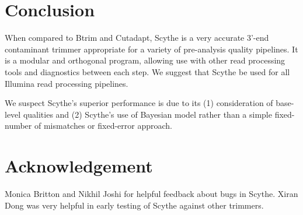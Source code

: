 \documentclass{bioinfo}
\begin{document}
\begin{methods}
\end{methods}

\section{Conclusion}

When compared to Btrim and Cutadapt, Scythe is a very accurate 3'-end
contaminant trimmer appropriate for a variety of pre-analysis quality
pipelines. It is a modular and orthogonal program, allowing use with
other read processing tools and diagnostics between each step. We
suggest that Scythe be used for all Illumina read processing
pipelines.

We suspect Scythe's superior performance is due to its (1)
consideration of base-level qualities and (2) Scythe's use of Bayesian
model rather than a simple fixed-number of mismatches or fixed-error
approach.


\section*{Acknowledgement}
Monica Britton and Nikhil Joshi for helpful feedback about bugs in
Scythe. Xiran Dong was very helpful in early testing of Scythe against
other trimmers.




% 
% 
% 
% 


\end{document}

